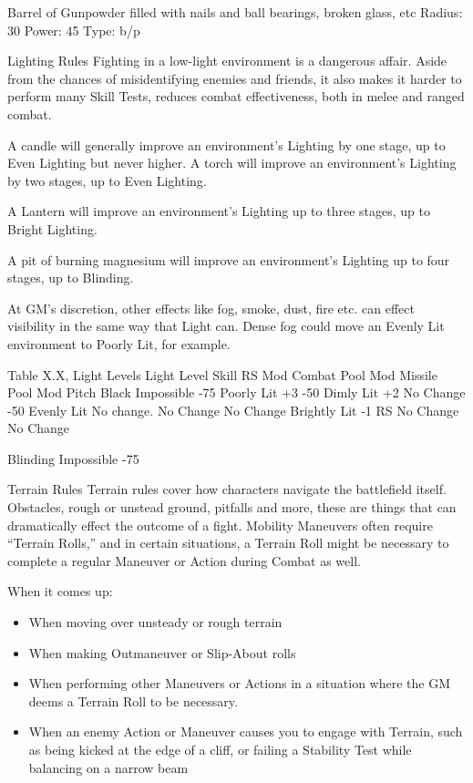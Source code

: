 \documentclass[oneside,11pt,english]{book}
\begin{document}
Barrel of Gunpowder filled with nails and ball bearings, broken glass, etc 
Radius: 30 
Power: 45 
Type: b/p 

 

 

Lighting Rules 
Fighting in a low-light environment is a dangerous affair. Aside from the chances of misidentifying 
enemies and friends, it also makes it harder to perform many Skill Tests, reduces combat effectiveness, 
both in melee and ranged combat. 

 

A candle will generally improve an environment’s Lighting by one stage, up to Even Lighting but never 
higher. 
A torch will improve an environment’s Lighting by two stages, up to Even Lighting. 

 

A Lantern will improve an environment’s Lighting up to three stages, up to Bright Lighting. 

 

A pit of burning magnesium will improve an environment’s Lighting up to four stages, up to Blinding. 

 

At GM’s discretion, other effects like fog, smoke, dust, fire etc. can effect visibility in the same way that 
Light can. Dense fog could move an Evenly Lit environment to Poorly Lit, for example. 

 

Table X.X, Light Levels 
Light Level Skill RS Mod Combat Pool Mod Missile Pool Mod 
Pitch Black Impossible -75%
Poorly Lit +3 -50%
Dimly Lit +2 No Change -50%
Evenly Lit No change. No Change No Change 
Brightly Lit -1 RS No Change No Change 


Blinding Impossible -75%

 

 

Terrain Rules 
Terrain rules cover how characters navigate the battlefield itself. Obstacles, rough or unstead ground, 
pitfalls and more, these are things that can dramatically effect the outcome of a fight. Mobility Maneuvers 
often require “Terrain Rolls,” and in certain situations, a Terrain Roll might be necessary to complete a 
regular Maneuver or Action during Combat as well. 

 

When it comes up: 
\begin{itemize}
\item When moving over unsteady or rough terrain 
\item When making Outmaneuver or Slip-About rolls 
\item When performing other Maneuvers or Actions in a situation where the GM deems a Terrain Roll 
to be necessary. 
\item When an enemy Action or Maneuver causes you to engage with Terrain, such as being kicked at 
the edge of a cliff, or failing a Stability Test while balancing on a narrow beam 
\end{itemize}
 
\end{document}
